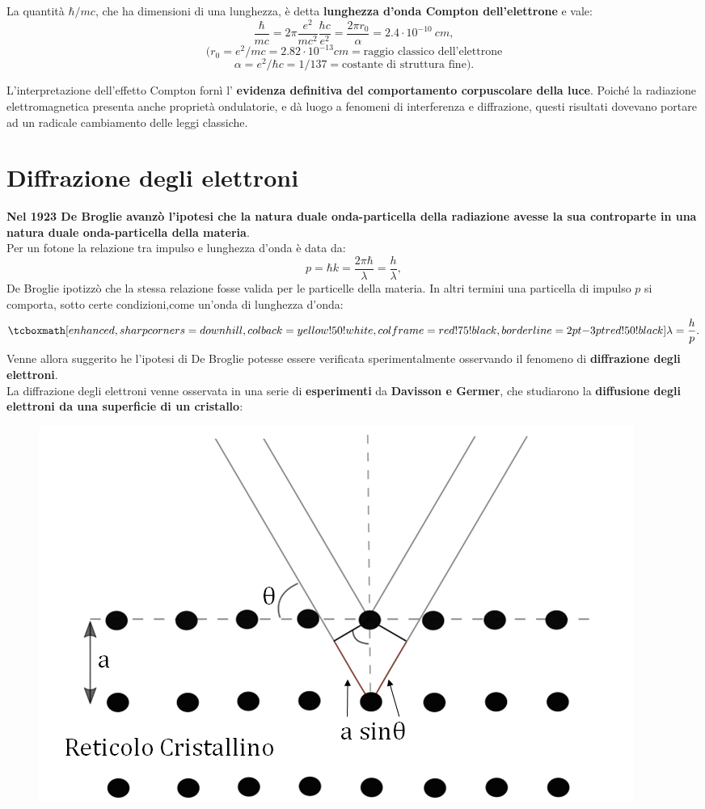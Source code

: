 La quantità $\hbar/ mc$, che ha dimensioni di una lunghezza, è detta \textbf{lunghezza d'onda Compton dell'elettrone} e vale:
\[
\frac{\hbar}{mc}= 2\pi \frac{e^2}{mc^2}\frac{\hbar c}{e^2}= \frac{2\pi r_0}{\alpha}= 2.4 \cdot 10^{-10} \ cm,
\]
\[(r_0 = e^2/mc = 2.82 \cdot 10^{-13} cm = \textrm{raggio classico dell'elettrone}\]
\[\alpha = e^2/\hbar c = 1/137 = \textrm{costante di struttura fine}).\]

L'interpretazione dell'effetto Compton fornì l' \textbf{evidenza definitiva del comportamento corpuscolare della luce}. Poiché la radiazione elettromagnetica presenta anche proprietà ondulatorie, e dà luogo a fenomeni di interferenza e diffrazione, questi risultati dovevano portare ad un radicale cambiamento delle leggi classiche.
\section{Diffrazione degli elettroni}
\textbf{Nel 1923 De Broglie avanzò l'ipotesi che la natura duale onda-particella della radiazione avesse la sua controparte in una natura duale onda-particella della materia}.\\
Per un fotone la relazione tra impulso e lunghezza d'onda è data da:
\begin{equation}
p= \hbar k = \frac{2\pi \hbar}{\lambda}=\frac{h}{\lambda},
\end{equation}
De Broglie ipotizzò che la stessa relazione fosse valida per le particelle della materia. In altri termini una particella di impulso $p$ si comporta, sotto certe condizioni,come un'onda di lunghezza d'onda:
	\begin{equation}
		\tcboxmath[enhanced,sharp corners=downhill ,colback=yellow!50!white,colframe=red!75!black, borderline={2pt}{-3pt}{red!50!black}]{
			\lambda=\frac{h}{p}.
			}
	\end{equation}
Venne allora suggerito he l'ipotesi di De Broglie potesse essere verificata sperimentalmente osservando il fenomeno di \textbf{diffrazione degli elettroni}.\\
La diffrazione degli elettroni venne osservata in una serie di \textbf{esperimenti} da \textbf{Davisson e Germer}, che studiarono la \textbf{diffusione degli elettroni da una superficie di un cristallo}:
	\begin{figure}[!htbp]
		\begin{center}
			\includegraphics[width=.55\textwidth]{immagini/cap_1/fig_1_5.png}
		\end{center}
	\end{figure}
